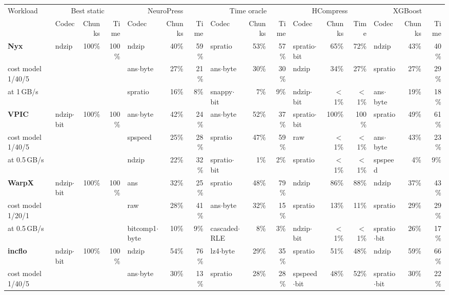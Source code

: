 \begin{table}[t]
\centering
\small
\begin{tabular}{l lrr lrr lrr lrr lrr}
\toprule
Workload & \multicolumn{3}{c}{Best static} & \multicolumn{3}{c}{NeuroPress} & \multicolumn{3}{c}{Time oracle} & \multicolumn{3}{c}{HCompress} & \multicolumn{3}{c}{XGBoost} \\
\cmidrule(lr){2-4} \cmidrule(lr){5-7} \cmidrule(lr){8-10} \cmidrule(lr){11-13} \cmidrule(lr){14-16}
 & Codec & Chunks & Time & Codec & Chunks & Time & Codec & Chunks & Time & Codec & Chunks & Time & Codec & Chunks & Time \\
\midrule
\textbf{Nyx} & ndzip & 100\% & 100\% & ndzip & 40\% & 59\% & spratio & 53\% & 57\% & spratio$\cdot$bit & 65\% & 72\% & ndzip & 43\% & 40\% \\
\scriptsize cost model 1/40/5 &  &  &  & ans$\cdot$byte & 27\% & 21\% & ans$\cdot$byte & 30\% & 30\% & ndzip & 34\% & 27\% & spratio & 27\% & 29\% \\
\scriptsize at 1\,GB/s &  &  &  & spratio & 16\% & 8\% & snappy$\cdot$bit & 7\% & 9\% & ndzip$\cdot$bit & $<$1\% & $<$1\% & ans$\cdot$byte & 19\% & 18\% \\
\midrule
\textbf{VPIC} & ndzip$\cdot$bit & 100\% & 100\% & ans$\cdot$byte & 42\% & 24\% & ans$\cdot$byte & 52\% & 37\% & spratio$\cdot$bit & 100\% & 100\% & spratio & 49\% & 61\% \\
\scriptsize cost model 1/40/5 &  &  &  & spspeed & 25\% & 28\% & spratio & 47\% & 59\% & raw & $<$1\% & $<$1\% & ans$\cdot$byte & 43\% & 23\% \\
\scriptsize at 0.5\,GB/s &  &  &  & ndzip & 22\% & 32\% & spratio$\cdot$bit & 1\% & 2\% & spratio & $<$1\% & $<$1\% & spspeed & 4\% & 9\% \\
\midrule
\textbf{WarpX} & ndzip$\cdot$bit & 100\% & 100\% & ans & 32\% & 25\% & spratio & 48\% & 79\% & ndzip & 86\% & 88\% & ndzip & 37\% & 43\% \\
\scriptsize cost model 1/20/1 &  &  &  & raw & 28\% & 41\% & ans$\cdot$byte & 32\% & 15\% & spratio & 13\% & 11\% & spratio & 29\% & 29\% \\
\scriptsize at 0.5\,GB/s &  &  &  & bitcomp1$\cdot$byte & 10\% & 9\% & cascaded$\cdot$RLE & 8\% & 3\% & ndzip$\cdot$bit & $<$1\% & $<$1\% & spratio$\cdot$bit & 26\% & 17\% \\
\midrule
\textbf{incflo} & ndzip$\cdot$bit & 100\% & 100\% & ndzip & 54\% & 76\% & lz4$\cdot$byte & 29\% & 35\% & spratio & 51\% & 48\% & ndzip & 59\% & 66\% \\
\scriptsize cost model 1/40/5 &  &  &  & ans$\cdot$byte & 30\% & 13\% & spratio & 28\% & 28\% & spspeed$\cdot$bit & 48\% & 52\% & spratio$\cdot$bit & 30\% & 22\% \\

\end{tabular}
\end{table}
